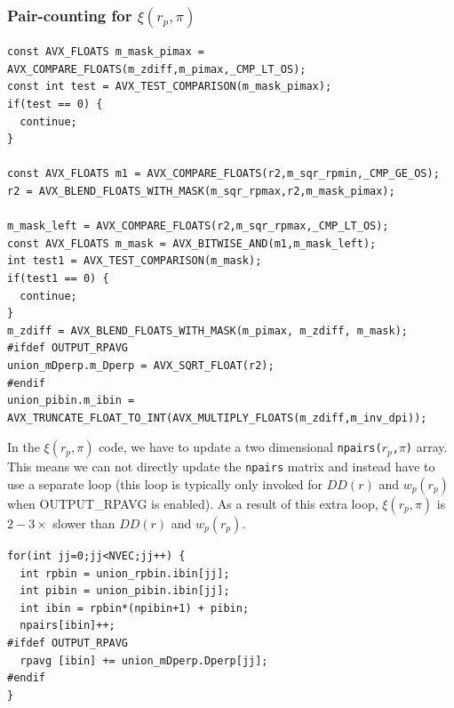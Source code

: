 \documentclass[12pt,titlepage]{article}
\newcommand{\xir}{\ensuremath{{DD(r)}}\xspace}
\newcommand{\wprp}{\ensuremath{{w_p(r_p)}}\xspace}
\newcommand{\xirppi}{\ensuremath{{\xi(r_p,\pi)}}\xspace}
\begin{document}
\subsubsection{Pair-counting for \texorpdfstring{\xirppi}{xi(rp,pi)}}\label{section:pair_counting_rp_pi}
\begin{lstlisting}[label={code:masks_xirppi},caption={Bit-masks in \xirppi.}]
const AVX_FLOATS m_mask_pimax = AVX_COMPARE_FLOATS(m_zdiff,m_pimax,_CMP_LT_OS);
const int test = AVX_TEST_COMPARISON(m_mask_pimax);
if(test == 0) {
  continue;
}

const AVX_FLOATS m1 = AVX_COMPARE_FLOATS(r2,m_sqr_rpmin,_CMP_GE_OS);
r2 = AVX_BLEND_FLOATS_WITH_MASK(m_sqr_rpmax,r2,m_mask_pimax);

m_mask_left = AVX_COMPARE_FLOATS(r2,m_sqr_rpmax,_CMP_LT_OS);
const AVX_FLOATS m_mask = AVX_BITWISE_AND(m1,m_mask_left);
int test1 = AVX_TEST_COMPARISON(m_mask);
if(test1 == 0) {
  continue;
}
m_zdiff = AVX_BLEND_FLOATS_WITH_MASK(m_pimax, m_zdiff, m_mask);
#ifdef OUTPUT_RPAVG
union_mDperp.m_Dperp = AVX_SQRT_FLOAT(r2);
#endif
union_pibin.m_ibin = AVX_TRUNCATE_FLOAT_TO_INT(AVX_MULTIPLY_FLOATS(m_zdiff,m_inv_dpi));
\end{lstlisting}
In the \xirppi code, we have to update a two dimensional \texttt{npairs($r_p$,$\pi$)} array. This means we can not directly update 
the \texttt{npairs} matrix and instead have to use a separate loop (this loop is typically only invoked for \xir and \wprp 
when OUTPUT\_RPAVG is enabled). As a result of this extra loop, \xirppi is $2-3\times$ slower than \xir and \wprp. 

\begin{lstlisting}[label={code:updating_histogram_xirppi},caption={Updating the \texttt{npairs} matrix in \xirppi.}]
for(int jj=0;jj<NVEC;jj++) {
  int rpbin = union_rpbin.ibin[jj];
  int pibin = union_pibin.ibin[jj];
  int ibin = rpbin*(npibin+1) + pibin;
  npairs[ibin]++;
#ifdef OUTPUT_RPAVG
  rpavg [ibin] += union_mDperp.Dperp[jj];
#endif
}
\end{lstlisting}
\end{document}
